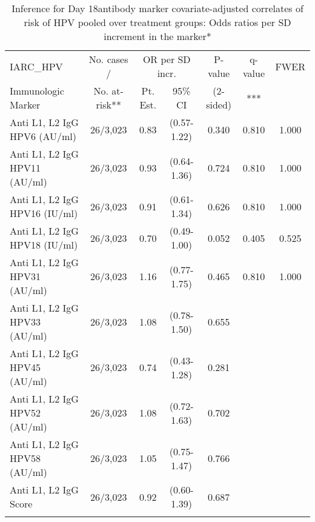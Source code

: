 \begin{longtable}{lcccccc}
\caption{Inference for Day 18antibody marker covariate-adjusted correlates of risk of HPV pooled over treatment groups: Odds ratios per SD increment in the marker*} \\ 
   \hline
 
         \multicolumn{1}{l}{IARC_HPV} & \multicolumn{1}{c}{No. cases /}   & \multicolumn{2}{c}{OR per SD incr.}                     & \multicolumn{1}{c}{P-value}   & \multicolumn{1}{c}{q-value}   & \multicolumn{1}{c}{FWER} \\ 
         \multicolumn{1}{l}{Immunologic Marker}            & \multicolumn{1}{c}{No. at-risk**} & \multicolumn{1}{c}{Pt. Est.} & \multicolumn{1}{c}{95\% CI} & \multicolumn{1}{c}{(2-sided)} & \multicolumn{1}{c}{***} & \multicolumn{1}{c}{} \\ 
         \hline
 
    Anti L1, L2 IgG HPV6 (AU/ml) & 26/3,023 & 0.83 & (0.57-1.22) & 0.340 & 0.810 & 1.000 \\ 
  Anti L1, L2 IgG HPV11 (AU/ml) & 26/3,023 & 0.93 & (0.64-1.36) & 0.724 & 0.810 & 1.000 \\ 
  Anti L1, L2 IgG HPV16 (IU/ml) & 26/3,023 & 0.91 & (0.61-1.34) & 0.626 & 0.810 & 1.000 \\ 
  Anti L1, L2 IgG HPV18 (IU/ml) & 26/3,023 & 0.70 & (0.49-1.00) & 0.052 & 0.405 & 0.525 \\ 
  Anti L1, L2 IgG HPV31 (AU/ml) & 26/3,023 & 1.16 & (0.77-1.75) & 0.465 & 0.810 & 1.000 \\ 
  Anti L1, L2 IgG HPV33 (AU/ml) & 26/3,023 & 1.08 & (0.78-1.50) & 0.655 &     &     \\ 
  Anti L1, L2 IgG HPV45 (AU/ml) & 26/3,023 & 0.74 & (0.43-1.28) & 0.281 &     &     \\ 
  Anti L1, L2 IgG HPV52 (AU/ml) & 26/3,023 & 1.08 & (0.72-1.63) & 0.702 &     &     \\ 
  Anti L1, L2 IgG HPV58 (AU/ml) & 26/3,023 & 1.05 & (0.75-1.47) & 0.766 &     &     \\ 
  Anti L1, L2 IgG Score & 26/3,023 & 0.92 & (0.60-1.39) & 0.687 &     &     \\ 
   \hline
\hline
\label{tab:CoR_univariable_logistic_pretty_scaled}
\end{longtable}

